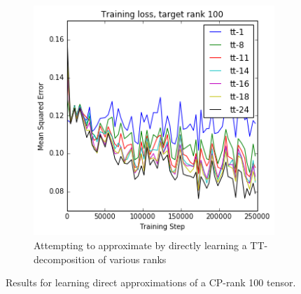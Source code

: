 \begin{figure}
\begin{subfigure}[t]{0.45\textwidth}
	\includegraphics[width=\textwidth]{tensors/cp100ttapprox}
	\caption{Attempting to approximate by directly learning a TT-decomposition of various ranks}
	\label{fig:cpttapprox}
\end{subfigure}
\caption{Results for learning direct approximations of a CP-rank 100 tensor.}
 \label{fig:cpapprox}
\end{figure}


